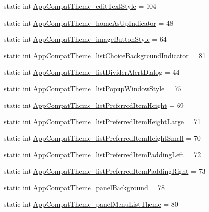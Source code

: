 \begin{DoxyCompactItemize}
\item 
static int \hyperlink{classandroid_1_1support_1_1v4_1_1R_1_1styleable_acaa134c2cef3cbfff2f66851831e5bd1}{App\+Compat\+Theme\+\_\+edit\+Text\+Style} = 104
\item 
static int \hyperlink{classandroid_1_1support_1_1v4_1_1R_1_1styleable_a99213e6dd1efe95a588f624e59528c4d}{App\+Compat\+Theme\+\_\+home\+As\+Up\+Indicator} = 48
\item 
static int \hyperlink{classandroid_1_1support_1_1v4_1_1R_1_1styleable_a549f21c88298e5099c63f6caa601fafb}{App\+Compat\+Theme\+\_\+image\+Button\+Style} = 64
\item 
static int \hyperlink{classandroid_1_1support_1_1v4_1_1R_1_1styleable_a08f9b1ee1dd8bb92832fce16a96ae03f}{App\+Compat\+Theme\+\_\+list\+Choice\+Background\+Indicator} = 81
\item 
static int \hyperlink{classandroid_1_1support_1_1v4_1_1R_1_1styleable_aeb30dd09362a7481a0324462b2ac5c82}{App\+Compat\+Theme\+\_\+list\+Divider\+Alert\+Dialog} = 44
\item 
static int \hyperlink{classandroid_1_1support_1_1v4_1_1R_1_1styleable_ae7d26e004b40152e1dfd2b283043a64f}{App\+Compat\+Theme\+\_\+list\+Popup\+Window\+Style} = 75
\item 
static int \hyperlink{classandroid_1_1support_1_1v4_1_1R_1_1styleable_a9b71c2c15e2b7ab9c0f8f48771d4444e}{App\+Compat\+Theme\+\_\+list\+Preferred\+Item\+Height} = 69
\item 
static int \hyperlink{classandroid_1_1support_1_1v4_1_1R_1_1styleable_a4bf9947a5a52f076cfc439791fc78ac5}{App\+Compat\+Theme\+\_\+list\+Preferred\+Item\+Height\+Large} = 71
\item 
static int \hyperlink{classandroid_1_1support_1_1v4_1_1R_1_1styleable_aad0605b48a4d815b0fdc77f1e4dacb4d}{App\+Compat\+Theme\+\_\+list\+Preferred\+Item\+Height\+Small} = 70
\item 
static int \hyperlink{classandroid_1_1support_1_1v4_1_1R_1_1styleable_ae536509d1f248feded607e1588900608}{App\+Compat\+Theme\+\_\+list\+Preferred\+Item\+Padding\+Left} = 72
\item 
static int \hyperlink{classandroid_1_1support_1_1v4_1_1R_1_1styleable_af5e021a7f52cfdc13201bf047025d17d}{App\+Compat\+Theme\+\_\+list\+Preferred\+Item\+Padding\+Right} = 73
\item 
static int \hyperlink{classandroid_1_1support_1_1v4_1_1R_1_1styleable_a9a25be61219ea77461c9e13d61a6eb9c}{App\+Compat\+Theme\+\_\+panel\+Background} = 78
\item 
static int \hyperlink{classandroid_1_1support_1_1v4_1_1R_1_1styleable_a70447b234629ffb93fa09bdc74f87251}{App\+Compat\+Theme\+\_\+panel\+Menu\+List\+Theme} = 80

\end{DoxyCompactItemize}
